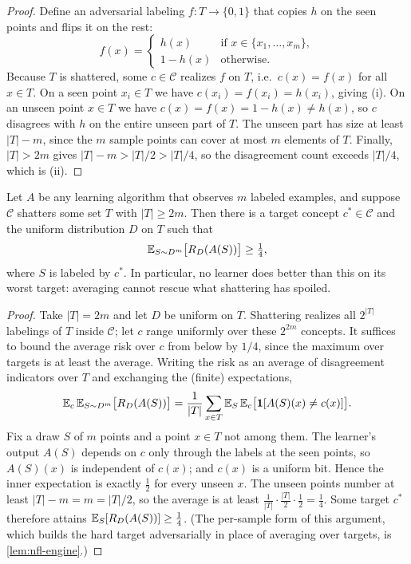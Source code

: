 \begin{proof}
Define an adversarial labeling $f : T \to \{0,1\}$ that copies $h$ on the seen points and flips it on the rest:
\[
f(x) = \begin{cases} h(x) & \text{if } x \in \{x_1,\dots,x_m\},\\ 1 - h(x) & \text{otherwise.}\end{cases}
\]
Because $T$ is shattered, some $c \in \mathcal{C}$ realizes $f$ on $T$, i.e.\ $c(x) = f(x)$ for all $x \in T$. On a seen point $x_i \in T$ we have $c(x_i) = f(x_i) = h(x_i)$, giving (i). On an unseen point $x \in T$ we have $c(x) = f(x) = 1 - h(x) \neq h(x)$, so $c$ disagrees with $h$ on the entire unseen part of $T$. The unseen part has size at least $|T| - m$, since the $m$ sample points can cover at most $m$ elements of $T$. Finally, $|T| > 2m$ gives $|T| - m > |T|/2 > |T|/4$, so the disagreement count exceeds $|T|/4$, which is (ii).
\end{proof}

\begin{thm}
\label{thm:nfl}
Let $A$ be any learning algorithm that observes $m$ labeled examples, and suppose $\mathcal{C}$ shatters some set $T$ with $|T| \geq 2m$. Then there is a target concept $c^\ast \in \mathcal{C}$ and the uniform distribution $D$ on $T$ such that
\[
\mathbb{E}_{S \sim D^m}\bigl[R_D(A(S))\bigr] \geq \tfrac{1}{4},
\]
where $S$ is labeled by $c^\ast$. In particular, no learner does better than this on its worst target: averaging cannot rescue what shattering has spoiled.
\end{thm}

\begin{proof}
Take $|T| = 2m$ and let $D$ be uniform on $T$. Shattering realizes all $2^{|T|}$ labelings of $T$ inside $\mathcal{C}$; let $c$ range uniformly over these $2^{2m}$ concepts. It suffices to bound the average risk over $c$ from below by $1/4$, since the maximum over targets is at least the average. Writing the risk as an average of disagreement indicators over $T$ and exchanging the (finite) expectations,
\[
\mathbb{E}_{c}\,\mathbb{E}_{S \sim D^m}\bigl[R_D(A(S))\bigr]
= \frac{1}{|T|}\sum_{x \in T} \mathbb{E}_{S}\,\mathbb{E}_{c}\bigl[\mathbf{1}[A(S)(x) \neq c(x)]\bigr].
\]
Fix a draw $S$ of $m$ points and a point $x \in T$ not among them. The learner's output $A(S)$ depends on $c$ only through the labels at the seen points, so $A(S)(x)$ is independent of $c(x)$; and $c(x)$ is a uniform bit. Hence the inner expectation is exactly $\tfrac{1}{2}$ for every unseen $x$. The unseen points number at least $|T| - m = m = |T|/2$, so the average is at least $\tfrac{1}{|T|}\cdot \tfrac{|T|}{2}\cdot\tfrac{1}{2} = \tfrac14$. Some target $c^\ast$ therefore attains $\mathbb{E}_S[R_D(A(S))] \geq \tfrac14$. (The per-sample form of this argument, which builds the hard target adversarially in place of averaging over targets, is \cref{lem:nfl-engine}.)
\end{proof}

